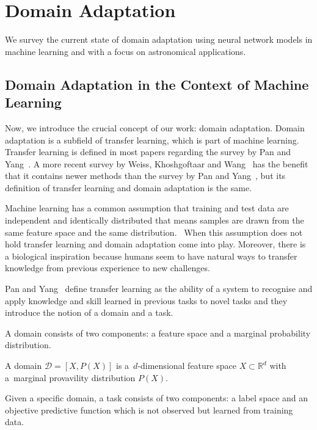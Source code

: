 \chapter{Domain Adaptation}
\label{da_chapter}

We survey the current state of domain adaptation using neural network models
in machine learning and with a focus on astronomical applications.


\section{Domain Adaptation in the Context of Machine Learning}

Now, we introduce the crucial concept of our work: domain adaptation.
Domain adaptation is a subfield of transfer learning,
which is part of machine learning.
Transfer learning is defined in most papers regarding the survey by Pan and Yang~\cite{pan2010}.
A more recent survey by Weiss, Khoshgoftaar and Wang~\cite{weiss2016} has the benefit
that it contains newer methods than the survey by Pan and Yang~\cite{pan2010},
but its definition of transfer learning and domain adaptation is the same.

Machine learning has a common assumption that training and test data are independent and identically distributed
that means samples are drawn from the same feature space and the same distribution.~\cite{daume2006}
When this assumption does not hold transfer learning and domain adaptation come into play.
Moreover, there is a biological inspiration
because humans seem to have natural ways to transfer knowledge from previous experience to new challenges.~\cite{torrey2010}

Pan and Yang~\cite{pan2010} define transfer learning
as the ability of a system to recognise and apply knowledge and skill
learned in previous tasks to novel tasks
and they introduce the notion of a domain and a task.

A domain consists of two components: a feature space and a marginal probability distribution.

\begin{definition}
	A domain \(\mathcal{D} = [X, P(X)]\)
	is a~\(d\)-dimensional feature space \(X \subset \mathbb{R}^d\)
	with a~marginal provavility distribution \(P(X)\).~\cite{pan2010}
\end{definition}

Given a specific domain, a task consists of two components: a label space and an objective predictive function
which is not observed but learned from training data.

